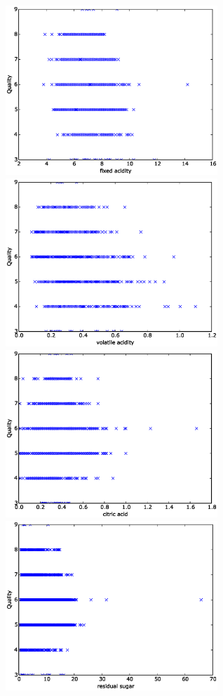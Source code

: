 \documentclass[11pt]{article}
\begin{document}
\begin{figure}[h]
  \centering
  \includegraphics[width=8cm]{fixed_acidity.eps}
  \includegraphics[width=8cm]{volatile_acidity.eps}
  \includegraphics[width=8cm]{citric_acid.eps}
  \includegraphics[width=8cm]{residual_sugar.eps}

\end{figure}
\end{document}

